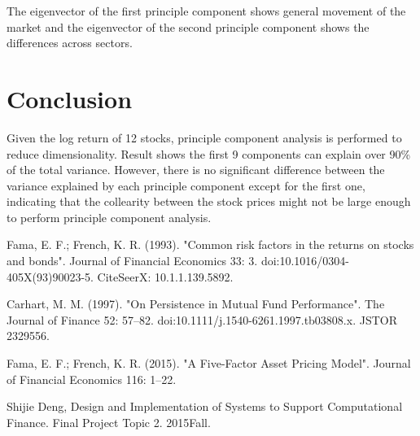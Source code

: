 \documentclass[conference]{IEEEtran}
\begin{document}
The eigenvector of the first principle component shows general movement of the market and the eigenvector of the second principle component shows the differences across sectors. 


\section{Conclusion}
Given the log return of 12 stocks, principle component analysis is performed to reduce dimensionality. Result shows the first 9 components can explain over 90\% of the total variance. However, there is no significant difference between the variance explained by each principle component except for the first one, indicating that the collearity between the stock prices might not be large enough to perform principle component analysis. 










%
%
%
\begin{thebibliography}{3}

Fama, E. F.; French, K. R. (1993). "Common risk factors in the returns on stocks and bonds". Journal of Financial Economics 33: 3. doi:10.1016/0304-405X(93)90023-5. CiteSeerX: 10.1.1.139.5892.

Carhart, M. M. (1997). "On Persistence in Mutual Fund Performance". The Journal of Finance 52: 57–82. doi:10.1111/j.1540-6261.1997.tb03808.x. JSTOR 2329556.

Fama, E. F.; French, K. R. (2015). "A Five-Factor Asset Pricing Model". Journal of Financial Economics 116: 1–22.

Shijie Deng, Design and Implementation of Systems to Support Computational Finance. Final Project Topic 2. 2015Fall. 


\end{thebibliography}
\end{document}

